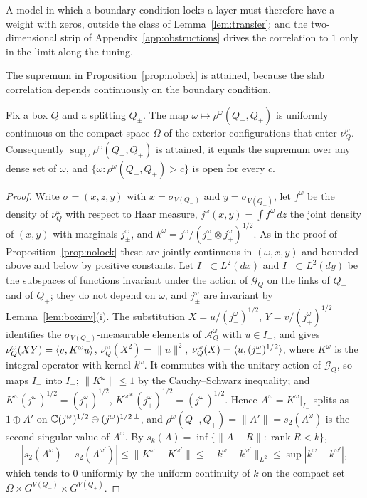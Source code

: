 A model in which a boundary condition locks a layer must therefore have a
weight with zeros, outside the class of Lemma~\ref{lem:transfer}; and the
two-dimensional strip of Appendix~\ref{app:obstructions} drives the
correlation to $1$ only in the limit along the tuning.

The supremum in Proposition~\ref{prop:nolock} is attained, because the
slab correlation depends continuously on the boundary condition.

\begin{lemma}\label{lem:rhocont}
Fix a box $Q$ and a splitting $Q_\pm$. The map $\omega\mapsto\rho^\omega
(Q_-,Q_+)$ is uniformly continuous on the compact space $\Omega$ of the
exterior configurations that enter $\nu^\omega_Q$. Consequently $\sup_\omega
\rho^\omega(Q_-,Q_+)$ is attained, it equals the supremum over any dense set
of $\omega$, and $\{\omega:\rho^\omega(Q_-,Q_+)>c\}$ is open for every $c$.
\end{lemma}

\begin{proof}
Write $\sigma=(x,z,y)$ with $x=\sigma_{V(Q_-)}$ and $y=\sigma_{V(Q_+)}$, let
$f^\omega$ be the density of $\nu^\omega_Q$ with respect to Haar measure,
$j^\omega(x,y)=\int f^\omega\,dz$ the joint density of $(x,y)$ with marginals
$j^\omega_\pm$, and $k^\omega=j^\omega/(j^\omega_-\otimes j^\omega_+)^{1/2}$.
As in the proof of Proposition~\ref{prop:nolock} these are jointly
continuous in $(\omega,x,y)$ and bounded above and below by positive
constants. Let $I_-\subset L^2(dx)$ and $I_+\subset L^2(dy)$ be the
subspaces of functions invariant under the action of $\mathcal G_Q$ on the
links of $Q_-$ and of $Q_+$; they do not depend on $\omega$, and $j^\omega_
\pm$ are invariant by Lemma~\ref{lem:boxinv}(i). The substitution $X=u/
(j^\omega_-)^{1/2}$, $Y=v/(j^\omega_+)^{1/2}$ identifies the $\sigma_{V(Q_-)}
$-measurable elements of $\mathcal A^\omega_Q$ with $u\in I_-$, and gives
$\nu^\omega_Q(XY)=\langle v,K^\omega u\rangle$, $\nu^\omega_Q(X^2)=\|u\|^2$, $\nu^\omega
_Q(X)=\langle u,(j^\omega_-)^{1/2}\rangle$, where $K^\omega$ is the integral operator
with kernel $k^\omega$. It commutes with the unitary action of $\mathcal G_Q$,
so maps $I_-$ into $I_+$; $\|K^\omega\|\le1$ by the Cauchy--Schwarz
inequality; and $K^\omega(j^\omega_-)^{1/2}=(j^\omega_+)^{1/2}$, $K^{\omega*}
(j^\omega_+)^{1/2}=(j^\omega_-)^{1/2}$. Hence $A^\omega=K^\omega|_{I_-}$ splits
as $1\oplus A'$ on $\mathbb{C}(j^\omega_-)^{1/2}\oplus(j^\omega_-)^{1/2\,\perp}$, and
$\rho^\omega(Q_-,Q_+)=\|A'\|=s_2(A^\omega)$ is the second singular value of
$A^\omega$. By $s_k(A)=\inf\{\|A-R\|:\operatorname{rank}R<k\}$,
\[
|s_2(A^\omega)-s_2(A^{\omega'})|\le\|K^\omega-K^{\omega'}\|\le\|k^\omega-
k^{\omega'}\|_{L^2}\le\sup|k^\omega-k^{\omega'}|,
\]
which tends to $0$ uniformly by the uniform continuity of $k$ on the
compact set $\Omega\times G^{V(Q_-)}\times G^{V(Q_+)}$.
\end{proof}

